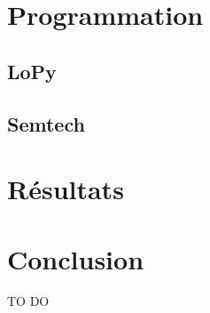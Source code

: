 \documentclass[11pt]{article}
\begin{document}
\section{Programmation}

\subsection{LoPy}
\subsection{Semtech}
\newpage
\section{Résultats}
\newpage
\section{Conclusion}
TO DO 
\newpage
\listoffigures
\newpage
\listofalgorithms
\newpage
\end{document}
